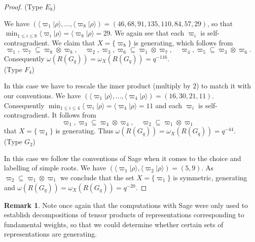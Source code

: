 \documentclass[11 pt, leqno]{amsart}
\newcommand{\la}{\langle}
\newcommand{\ra}{\rangle}
\theoremstyle{definition}
\newtheorem{remark}[theorem]{Remark}
\numberwithin{equation}{section}
\begin{document}
\begin{proof}
(Type $E_8$) 

We have $(\la \varpi_1|\rho\ra ,\dotsc,\la \varpi_8|\rho\ra)=(46,68,91,135,110,84,57,29)$, so that $\min_{1\le i \le 8}\la \varpi_i|\rho\ra = \la \varpi_8|\rho\ra =29$. We again see that each $\varpi_i$ is self-contragradient. We claim that $X=\{\varpi_8\}$ is generating, which follows from
\[
\varpi_1,\varpi_7\subseteq \varpi_8\otimes\varpi_8,\quad
\varpi_2, \varpi_3, \varpi_6 \subseteq \varpi_1\otimes \varpi_7,\quad
\varpi_4,\varpi_5  \subseteq \varpi_3\otimes\varpi_6.
\]
Consequently $\omega(R(G_q))=\omega_{X}(R(G_q))=q^{-116}$.\\

(Type $F_4$) 

In this case we have to rescale the inner product (multiply by $2$) to match it with our conventions. We have $(\la\varpi_1|\rho\ra,\dotsc,\la\varpi_4|\rho\ra )=(16,30,21,11)$. Consequently $\min_{1\le i \le 4}\la\varpi_i|\rho\ra =\la\varpi_4|\rho\ra=11$ and each $\varpi_i$ is self-contragradient. It follows from
\[
\varpi_1, \varpi_3 \subseteq \varpi_4\otimes\varpi_4,\quad 
\varpi_2\subseteq \varpi_1\otimes\varpi_1
\]
that $X=\{\varpi_4\}$ is generating. Thus $\omega(R(G_q))=\omega_{X}(R(G_q))=q^{-44}$.\\

(Type $G_2$) 

In this case we follow the conventions of Sage when it comes to the choice and labelling of simple roots. We have $(\la \varpi_1|\rho\ra,\la\varpi_2|\rho\ra)=(5,9)$. As $\varpi_2\subseteq \varpi_1\otimes\varpi_1$ we conclude that the set $X=\{\varpi_1\}$ is symmetric, generating and $\omega(R(G_q))=\omega_{X}(R(G_q))=q^{-20}$.

\end{proof} 

\begin{remark}
	Note once again that the computations with Sage were only used to establish decompositions of tensor products of representations corresponding to fundamental weights, so that we could determine whether certain sets of representations are generating.
\end{remark}
\end{document}

